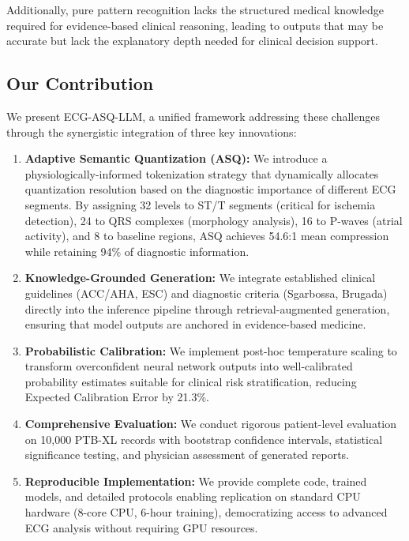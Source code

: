\documentclass[journal]{IEEEtran}
\begin{document}
Additionally, pure pattern recognition lacks the structured medical knowledge required for evidence-based clinical reasoning, leading to outputs that may be accurate but lack the explanatory depth needed for clinical decision support.

\subsection{Our Contribution}

We present ECG-ASQ-LLM, a unified framework addressing these challenges through the synergistic integration of three key innovations:

\begin{enumerate}
\item \textbf{Adaptive Semantic Quantization (ASQ):} We introduce a physiologically-informed tokenization strategy that dynamically allocates quantization resolution based on the diagnostic importance of different ECG segments. By assigning 32 levels to ST/T segments (critical for ischemia detection), 24 to QRS complexes (morphology analysis), 16 to P-waves (atrial activity), and 8 to baseline regions, ASQ achieves 54.6:1 mean compression while retaining 94\% of diagnostic information.

\item \textbf{Knowledge-Grounded Generation:} We integrate established clinical guidelines (ACC/AHA, ESC) and diagnostic criteria (Sgarbossa, Brugada) directly into the inference pipeline through retrieval-augmented generation, ensuring that model outputs are anchored in evidence-based medicine.

\item \textbf{Probabilistic Calibration:} We implement post-hoc temperature scaling to transform overconfident neural network outputs into well-calibrated probability estimates suitable for clinical risk stratification, reducing Expected Calibration Error by 21.3\%.

\item \textbf{Comprehensive Evaluation:} We conduct rigorous patient-level evaluation on 10,000 PTB-XL records with bootstrap confidence intervals, statistical significance testing, and physician assessment of generated reports.

\item \textbf{Reproducible Implementation:} We provide complete code, trained models, and detailed protocols enabling replication on standard CPU hardware (8-core CPU, 6-hour training), democratizing access to advanced ECG analysis without requiring GPU resources.
\end{enumerate}
\end{document}
